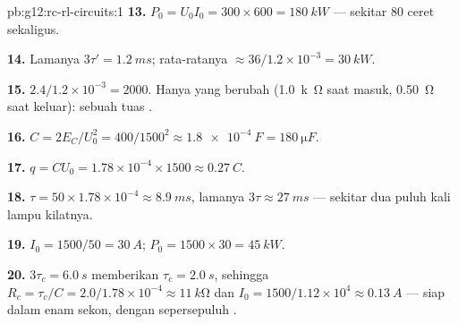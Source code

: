 \begin{solution}{pb:g12:rc-rl-circuits:1}
\textbf{13.} $P_0 = U_0 I_0 = 300 \times 600 = \qty{180}{kW}$ --- sekitar
$80$ ceret sekaligus.

\textbf{14.} Lamanya $3\tau' = \qty{1.2}{ms}$;  rata-ratanya
$\approx 36/1.2\times10^{-3} = \qty{30}{kW}$.

\textbf{15.} $2.4/1.2\times10^{-3} = 2000$. Hanya  yang berubah
(\qty{1.0}{k\ohm} saat masuk, \qty{0.50}{\ohm} saat keluar): sebuah tuas .

\textbf{16.} $C = 2E_C/U_0^2 = 400/1500^2 \approx \qty{1.8e-4}{F} =
\qty{180}{\micro F}$.

\textbf{17.} $q = CU_0 = 1.78\times10^{-4} \times 1500 \approx
\qty{0.27}{C}$.

\textbf{18.} $\tau = 50 \times 1.78\times10^{-4} \approx \qty{8.9}{ms}$,
lamanya $3\tau \approx \qty{27}{ms}$ --- sekitar dua puluh kali lampu kilatnya.

\textbf{19.} $I_0 = 1500/50 = \qty{30}{A}$;
$P_0 = 1500 \times 30 = \qty{45}{kW}$.

\textbf{20.} $3\tau_c = \qty{6.0}{s}$ memberikan $\tau_c = \qty{2.0}{s}$, sehingga
$R_c = \tau_c/C = 2.0/1.78\times10^{-4} \approx \qty{11}{k\ohm}$ dan
$I_0 = 1500/1.12\times10^{4} \approx \qty{0.13}{A}$ --- siap dalam enam
sekon, dengan sepersepuluh .
\end{solution}
